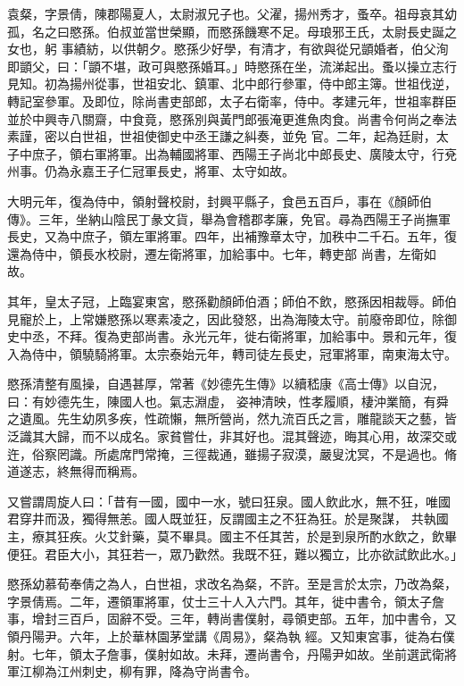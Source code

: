 
\begin{pinyinscope}

 袁粲，字景倩，陳郡陽夏人，太尉淑兄子也。父濯，揚州秀才，蚤卒。祖母哀其幼孤，名之曰愍孫。伯叔並當世榮顯，而愍孫饑寒不足。母琅邪王氏，太尉長史誕之女也，躬
 事績紡，以供朝夕。愍孫少好學，有清才，有欲與從兄顗婚者，伯父洵即顗父，曰：「顗不堪，政可與愍孫婚耳。」時愍孫在坐，流涕起出。蚤以操立志行見知。初為揚州從事，世祖安北、鎮軍、北中郎行參軍，侍中郎主簿。世祖伐逆，轉記室參軍。及即位，除尚書吏部郎，太子右衛率，侍中。孝建元年，世祖率群臣並於中興寺八關齋，中食竟，愍孫別與黃門郎張淹更進魚肉食。尚書令何尚之奉法素謹，密以白世祖，世祖使御史中丞王謙之糾奏，並免
 官。二年，起為廷尉，太子中庶子，領右軍將軍。出為輔國將軍、西陽王子尚北中郎長史、廣陵太守，行兗州事。仍為永嘉王子仁冠軍長史，將軍、太守如故。



 大明元年，復為侍中，領射聲校尉，封興平縣子，食邑五百戶，事在《顏師伯傳》。三年，坐納山陰民丁彖文貨，舉為會稽郡孝廉，免官。尋為西陽王子尚撫軍長史，又為中庶子，領左軍將軍。四年，出補豫章太守，加秩中二千石。五年，復還為侍中，領長水校尉，遷左衛將軍，加給事中。七年，轉吏部
 尚書，左衛如故。



 其年，皇太子冠，上臨宴東宮，愍孫勸顏師伯酒；師伯不飲，愍孫因相裁辱。師伯見寵於上，上常嫌愍孫以寒素凌之，因此發怒，出為海陵太守。前廢帝即位，除御史中丞，不拜。復為吏部尚書。永光元年，徙右衛將軍，加給事中。景和元年，復入為侍中，領驍騎將軍。太宗泰始元年，轉司徒左長史，冠軍將軍，南東海太守。



 愍孫清整有風操，自遇甚厚，常著《妙德先生傳》以續嵇康《高士傳》以自況，曰：有妙德先生，陳國人也。氣志淵虛，
 姿神清映，性孝履順，棲沖業簡，有舜之遺風。先生幼夙多疾，性疏懶，無所營尚，然九流百氏之言，雕龍談天之藝，皆泛識其大歸，而不以成名。家貧嘗仕，非其好也。混其聲迹，晦其心用，故深交或迕，俗察罔識。所處席門常掩，三徑裁通，雖揚子寂漠，嚴叟沈冥，不是過也。脩道遂志，終無得而稱焉。



 又嘗謂周旋人曰：「昔有一國，國中一水，號曰狂泉。國人飲此水，無不狂，唯國君穿井而汲，獨得無恙。國人既並狂，反謂國主之不狂為狂。於是聚謀，
 共執國主，療其狂疾。火艾針藥，莫不畢具。國主不任其苦，於是到泉所酌水飲之，飲畢便狂。君臣大小，其狂若一，眾乃歡然。我既不狂，難以獨立，比亦欲試飲此水。」



 愍孫幼慕荀奉倩之為人，白世祖，求改名為粲，不許。至是言於太宗，乃改為粲，字景倩焉。二年，遷領軍將軍，仗士三十人入六門。其年，徙中書令，領太子詹事，增封三百戶，固辭不受。三年，轉尚書僕射，尋領吏部。五年，加中書令，又領丹陽尹。六年，上於華林園茅堂講《周易》，粲為執
 經。又知東宮事，徙為右僕射。七年，領太子詹事，僕射如故。未拜，遷尚書令，丹陽尹如故。坐前選武衛將軍江柳為江州刺史，柳有罪，降為守尚書令。




\end{pinyinscope}
